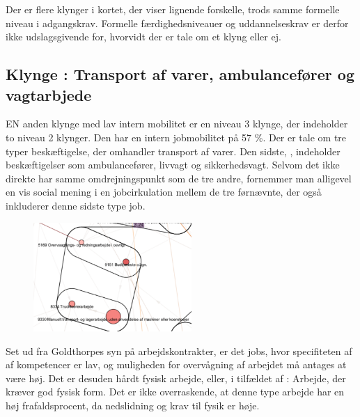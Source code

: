 Der er flere klynger i kortet, der viser lignende forskelle, trods samme formelle niveau i adgangskrav. Formelle færdighedsniveauer og uddannelseskrav er derfor ikke udslagsgivende for, hvorvidt der er tale om et klyng eller ej. %


\subsection{Klynge : Transport af varer, ambulancefører og vagtarbjede}

EN anden klynge  med lav intern mobilitet er en niveau 3 klynge, der indeholder to niveau 2 klynger. Den har en intern jobmobilitet på 57 \%. Der er tale om tre typer beskæftigelse, der omhandler transport af varer. Den sidste, , indeholder beskæftigelser som ambulancefører, livvagt og sikkerhedsvagt. Selvom det ikke direkte har samme omdrejningspunkt som de tre andre, fornemmer man alligevel en vis social mening i en jobcirkulation mellem de tre førnævnte, der også inkluderer denne sidste type job. 

%
\begin{figure}
  \vspace{-20pt}
  \begin{center}
    \includegraphics[width=6cm]{fig/segzoom/seg_3_24_internmob.pdf}
   \caption{}
   \label{fig_delanalyse1_zoom_3_24}
  \end{center}
  \vspace{-20pt}
\end{figure}
%

Set ud fra Goldthorpes syn på arbejdskontrakter, er det jobs, hvor specifiteten af af kompetencer er lav, og muligheden for overvågning af arbejdet må antages at være høj. Det er desuden hårdt fysisk arbejde, eller, i  tilfældet af : Arbejde, der kræver god fysisk form. Det er ikke overraskende, at denne type arbejde har en høj frafaldsprocent, da nedslidning og krav til fysik er høje. %



